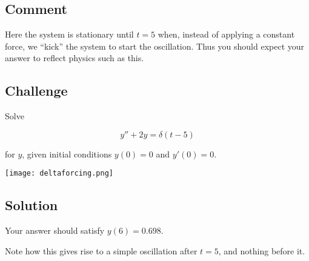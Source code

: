 \subsection*{Comment}
Here the system is stationary until $t=5$ when, instead of applying a constant force, we ``kick'' the system to start the oscillation. Thus you should expect your answer to reflect physics such as this.

\subsection*{Challenge}
Solve

\begin{equation}
    y''+2y=\delta(t-5)
\end{equation}

for $y$, given initial conditions $y(0)=0$ and $y'(0)=0$. 

\texttt{[image: deltaforcing.png]}

\subsection*{Solution}
Your answer should satisfy $y(6)=0.698$.

Note how this gives rise to a simple oscillation after $t=5$, and nothing before it.
\fi
